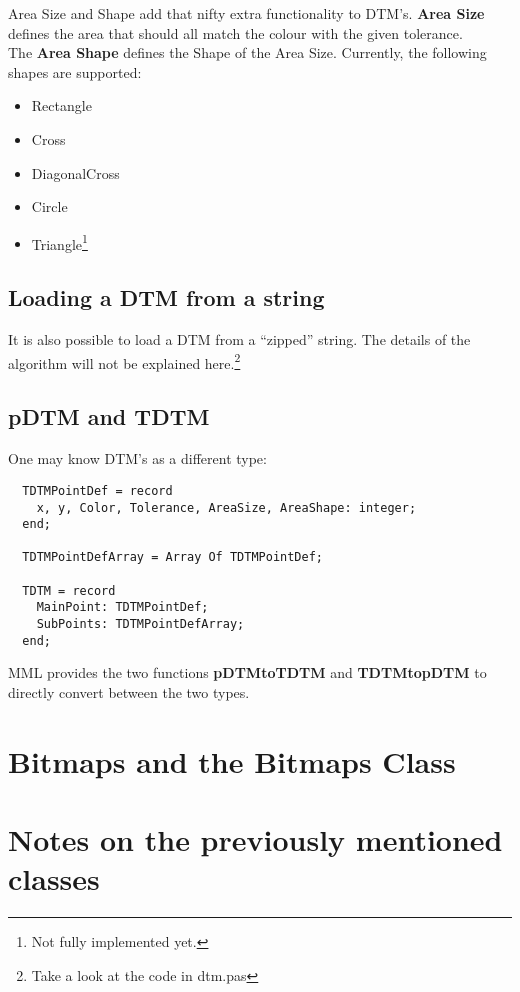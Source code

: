 \documentclass[a4paper, 10pt]{report} %
\begin{document}
Area Size and Shape add that nifty extra functionality to DTM's.
\textbf{Area Size} defines the area that should all match the colour with the given
tolerance. \\

The \textbf{Area Shape} defines the Shape of the Area Size.
Currently, the following shapes are supported:
\begin{itemize}
	\item Rectangle
	\item Cross
	\item DiagonalCross
	\item Circle
	\item Triangle\footnote{Not fully implemented yet.}
\end{itemize}

\subsection{Loading a DTM from a string}

It is also possible to load a DTM from a ``zipped'' string.
The details of the algorithm will not be explained here.\footnote{Take
a look at the code in dtm.pas}

\subsection{pDTM and TDTM}

One may know DTM's as a different type:

\begin{verbatim}
  TDTMPointDef = record
    x, y, Color, Tolerance, AreaSize, AreaShape: integer;
  end;

  TDTMPointDefArray = Array Of TDTMPointDef;

  TDTM = record
    MainPoint: TDTMPointDef;
    SubPoints: TDTMPointDefArray;
  end;    
\end{verbatim}

MML provides the two functions \textbf{pDTMtoTDTM} and \textbf{TDTMtopDTM} to
directly convert between the two types.

\section{Bitmaps and the Bitmaps Class}



\section{Notes on the previously mentioned classes}
\end{document}
